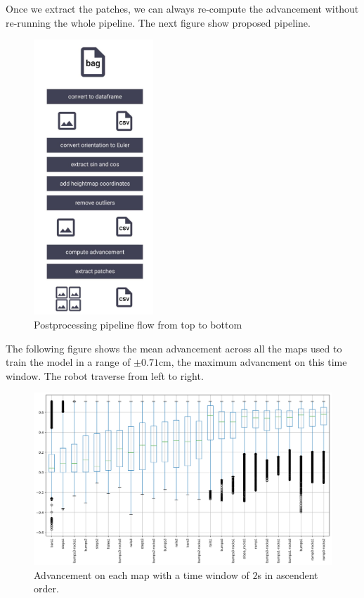 \documentclass[../document.tex]{subfiles}
\begin{document}
Once we extract the patches, we can always re-compute the advancement without re-running the whole pipeline. The next figure show proposed pipeline.
\begin{figure}[H] 
\centering
\includegraphics[width=0.4\textwidth]{../img/postprocessing-pipeline.jpg}
\caption{Postprocessing pipeline flow from top to bottom}
\label{fig: postprocessing-pipeline}
\end{figure}
The following figure shows the mean advancement across all the maps used to train the model in a range of $\pm 0.71$cm, the maximum advancment on this time window. The robot traverse from left to right.
\begin{figure}[H]
    \centering
    \includegraphics[width=\linewidth]{../img/datasets/box_for_each_map.png}
    \caption{Advancement on each map with a time window of $2$s in ascendent order.}
\end{figure}
\end{document}
